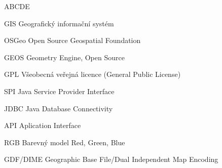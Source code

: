 
\begin{seznamzkratek}{ABCDE}

	      {GIS}
	      {Geografický informační systém}

	      {OSGeo}
	      {Open Source Geospatial Foundation}
      
	      {GEOS}
	      {Geometry Engine, Open Source}
	      
	      
	      
	      {GPL}
	      {Všeobecná veřejná licence (General Public License)}
	      
	      {SPI}
	      {Java Service Provider Interface}
	      
	      {JDBC}
	      {Java Database Connectivity}
	      
	      {API}
	      {Aplication Interface}
	      
	      {RGB}
	      {Barevný model Red, Green, Blue}

	      {GDF/DIME}
	      {Geographic Base File/Dual Independent Map Encoding}
	      
	      

\end{seznamzkratek}